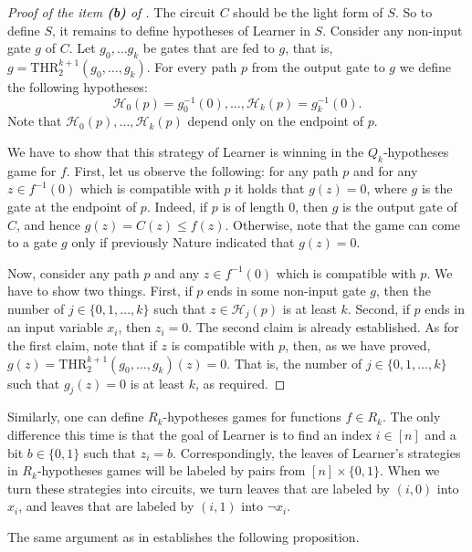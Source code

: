 \documentclass{toc}
\def\THR{\mathrm{THR}}
\begin{document}
\begin{proof}[Proof of the item \textbf{(b)} of ]
The circuit $C$ should be the light form of $S$. So to define $S$, it remains to define hypotheses of Learner in $S$. Consider any non-input gate $g$ of $C$. Let $g_0, \ldots g_k$ be gates that are fed to $g$, that is, $g = \THR^{k+1}_2(g_0, \ldots, g_k)$. For every path $p$ from the output gate to $g$ we define the following hypotheses:
\[
 \mathcal{H}_0(p) = g_0^{-1}(0), \ldots, \mathcal{H}_k(p) = g_k^{-1}(0).
\]
Note that $\mathcal{H}_0(p), \ldots, \mathcal{H}_k(p)$ depend only on the endpoint of $p$. 

We have to show that this strategy of Learner is winning in the $Q_k$-hypotheses game for $f$. First, let us observe the following: for any path $p$ and for any $z\in f^{-1}(0)$ which is compatible with $p$ it holds that $g(z) = 0$, where $g$ is the gate at the endpoint of $p$. Indeed, if $p$ is of length 0, then $g$ is the output gate of $C$, and hence $g(z) = C(z) \le f(z)$. Otherwise, note that the game can come to a gate $g$ only if previously Nature indicated that $g(z) = 0$.

Now, consider any path $p$ and any $z\in f^{-1}(0)$ which is compatible with $p$. We have to show two things. First, if $p$ ends in some non-input gate $g$, then the number of $j\in\{0, 1, \ldots, k\}$ such that $z\in \mathcal{H}_j(p)$ is at least $k$. Second, if $p$ ends in an input variable $x_i$, then $z_i = 0$. The second claim is already established. As for the first claim, note that if $z$ is compatible with $p$, then, as we have proved, $g(z) = \THR^{k+1}_2(g_0, \ldots, g_k)(z) = 0$. That is, the number of $j\in\{0, 1,\ldots,k\}$ such that $g_j(z) = 0$ is at least $k$, as required.
\end{proof}

Similarly, one can define $R_k$-hypotheses games for functions $f\in R_k$. The only difference this time is that the goal of Learner is to find an index $i\in[n]$ and a bit $b\in \{0,1\}$ such that $z_i = b$. Correspondingly,
%
the leaves %
of Learner's strategies in $R_k$-hypotheses games will be labeled by pairs from $[n]\times\{0,1\}$. When we turn these strategies into circuits, we
turn %
leaves  %
that are labeled by $(i, 0)$ into $x_i$, and %
leaves  %
that are labeled by $(i, 1)$ into $\lnot x_i$.

The same argument as in  establishes the following proposition.
 
\end{document}
